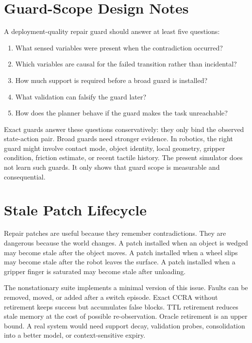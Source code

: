 \documentclass{article}
\begin{document}
\section{Guard-Scope Design Notes}

A deployment-quality repair guard should answer at least five questions:
\begin{enumerate}
    \item What sensed variables were present when the contradiction occurred?
    \item Which variables are causal for the failed transition rather than incidental?
    \item How much support is required before a broad guard is installed?
    \item What validation can falsify the guard later?
    \item How does the planner behave if the guard makes the task unreachable?
\end{enumerate}

Exact guards answer these questions conservatively: they only bind the observed state-action pair. Broad guards need stronger evidence. In robotics, the right guard might involve contact mode, object identity, local geometry, gripper condition, friction estimate, or recent tactile history. The present simulator does not learn such guards. It only shows that guard scope is measurable and consequential.

\section{Stale Patch Lifecycle}

Repair patches are useful because they remember contradictions. They are dangerous because the world changes. A patch installed when an object is wedged may become stale after the object moves. A patch installed when a wheel slips may become stale after the robot leaves the surface. A patch installed when a gripper finger is saturated may become stale after unloading.

The nonstationary suite implements a minimal version of this issue. Faults can be removed, moved, or added after a switch episode. Exact CCRA without retirement keeps success but accumulates false blocks. TTL retirement reduces stale memory at the cost of possible re-observation. Oracle retirement is an upper bound. A real system would need support decay, validation probes, consolidation into a better model, or context-sensitive expiry.
\end{document}
